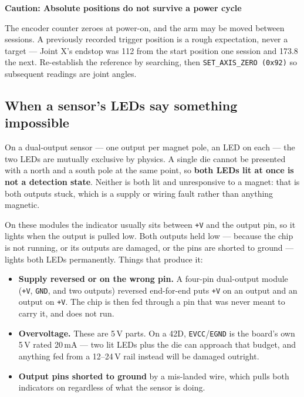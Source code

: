 \documentclass[11pt,letterpaper]{article}
\newenvironment{caution}[1]{%
    \par\addvspace{8pt}%
    \noindent{\color{cautionred}\rule{\linewidth}{0.8pt}}\par\vspace{2pt}
    \noindent\textbf{\color{cautionred}Caution: #1}\par\vspace{2pt}
}{%
    \par\vspace{2pt}\noindent{\color{cautionred}\rule{\linewidth}{0.4pt}}%
    \par\addvspace{8pt}%
}
\begin{document}
\begin{caution}{Absolute positions do not survive a power cycle}
The encoder counter zeroes at power-on, and the arm may be moved between sessions.
A previously recorded trigger position is a rough expectation, never a target ---
Joint X's endstop was 112\textdegree{} from the start position one session and
173.8\textdegree{} the next. Re-establish the reference by searching, then
\texttt{SET\_AXIS\_ZERO (0x92)} so subsequent readings are joint angles.
\end{caution}

\subsection{When a sensor's LEDs say something impossible}
On a dual-output sensor --- one output per magnet pole, an LED on each --- the
two LEDs are mutually exclusive by physics. A single die cannot be presented
with a north and a south pole at the same point, so \textbf{both LEDs lit at once
is not a detection state}. Neither is both lit and unresponsive to a magnet: that
is both outputs stuck, which is a supply or wiring fault rather than anything
magnetic.

On these modules the indicator usually sits between \texttt{+V} and the output
pin, so it lights when the output is pulled low. Both outputs held low ---
because the chip is not running, or its outputs are damaged, or the pins are
shorted to ground --- lights both LEDs permanently. Things that produce it:

\begin{itemize}
    \item \textbf{Supply reversed or on the wrong pin.} A four-pin dual-output
    module (\texttt{+V}, \texttt{GND}, and two outputs) reversed end-for-end puts
    \texttt{+V} on an output and an output on \texttt{+V}. The chip is then
    fed through a pin that was never meant to carry it, and does not run.
    \item \textbf{Overvoltage.} These are 5\,V parts. On a 42D,
    \texttt{EVCC}/\texttt{EGND} is the board's own 5\,V rated 20\,mA --- two lit
    LEDs plus the die can approach that budget, and anything fed from a 12--24\,V
    rail instead will be damaged outright.
    \item \textbf{Output pins shorted to ground} by a mis-landed wire, which pulls
    both indicators on regardless of what the sensor is doing.
\end{itemize}
\end{document}

